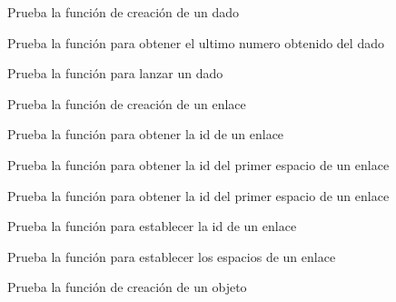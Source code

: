 
\begin{DoxyRefList}
\item[\label{test__test000001}%
\Hypertarget{test__test000001}%
Member \hyperlink{die__test_8h_ac0b610468bd3d3b358051c966b771431}{test1\+\_\+die\+\_\+create} ()]Prueba la función de creación de un dado  
\item[\label{test__test000004}%
\Hypertarget{test__test000004}%
Member \hyperlink{die__test_8h_a99e873ecce6a19186919e991876dadbe}{test1\+\_\+die\+\_\+get\+\_\+last\+\_\+roll} ()]Prueba la función para obtener el ultimo numero obtenido del dado  
\item[\label{test__test000002}%
\Hypertarget{test__test000002}%
Member \hyperlink{die__test_8h_ac005cb42fa33b38a79896934a5a50001}{test1\+\_\+die\+\_\+roll} ()]Prueba la función para lanzar un dado  
\item[\label{test__test000006}%
\Hypertarget{test__test000006}%
Member \hyperlink{link__test_8h_a82c5ee441ad22caad8272212a9e9cc26}{test1\+\_\+link\+\_\+create} ()]Prueba la función de creación de un enlace  
\item[\label{test__test000012}%
\Hypertarget{test__test000012}%
Member \hyperlink{link__test_8h_a19c70f79fd51d123173f7aaf6ae50bf8}{test1\+\_\+link\+\_\+get\+\_\+id} ()]Prueba la función para obtener la id de un enlace  
\item[\label{test__test000013}%
\Hypertarget{test__test000013}%
Member \hyperlink{link__test_8h_a4c7b18c0280546b25af5f9d0a3930b29}{test1\+\_\+link\+\_\+get\+\_\+space1\+\_\+id} ()]Prueba la función para obtener la id del primer espacio de un enlace  
\item[\label{test__test000014}%
\Hypertarget{test__test000014}%
Member \hyperlink{link__test_8h_a71f726addc6f12767a839b7a3799b97d}{test1\+\_\+link\+\_\+get\+\_\+space2\+\_\+id} ()]Prueba la función para obtener la id del primer espacio de un enlace  
\item[\label{test__test000008}%
\Hypertarget{test__test000008}%
Member \hyperlink{link__test_8h_ac2b67785fdf6bb85af93e985af9ee3f2}{test1\+\_\+link\+\_\+set\+\_\+id} ()]Prueba la función para establecer la id de un enlace  
\item[\label{test__test000010}%
\Hypertarget{test__test000010}%
Member \hyperlink{link__test_8h_ae3df3369cfff931db20aeb87b4a77370}{test1\+\_\+link\+\_\+set\+\_\+spaces} ()]Prueba la función para establecer los espacios de un enlace  
\item[\label{test__test000015}%
\Hypertarget{test__test000015}%
Member \hyperlink{object__test_8h_a3836d69f92ce7149d56bafcaec83f516}{test1\+\_\+object\+\_\+create} ()]Prueba la función de creación de un objeto  

\end{DoxyRefList}
